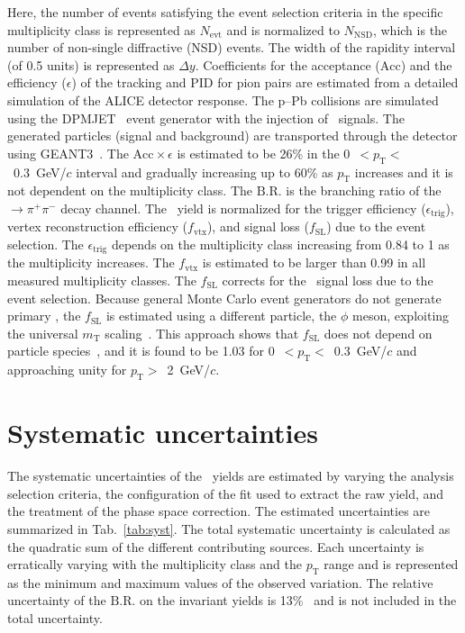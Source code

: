 Here, the number of events satisfying the event selection criteria in the specific multiplicity class is represented as $N_{\mathrm{evt}}$ and is normalized to $N_{\mathrm{NSD}}$, which is the number of non-single diffractive (NSD) events. The width of the rapidity interval (of 0.5 units) is represented as $\Delta y$. Coefficients for the acceptance ($\mathrm{Acc}$) and the efficiency ($\epsilon$) of the tracking and PID for pion pairs are estimated from a detailed simulation of the ALICE detector response. The p--Pb collisions are simulated using the DPMJET~\cite{Fedynitch:2015kcn} event generator with the injection of \fzero~signals. The generated particles (signal and background) are transported through the detector using GEANT3~\cite{Brun:1994aa}. The $\mathrm{Acc}\times\epsilon$ is estimated to be 26\% in the 0~$<p_{\mathrm{T}}<$~0.3~GeV/$c$ interval and gradually increasing up to 60\% as $p_{\mathrm{T}}$ increases and it is not dependent on the multiplicity class. The $\mathrm{B.R.}$ is the branching ratio of the \fzero~$\rightarrow \pi^{+}\pi^{-}$ decay channel. The \fzero~yield is normalized for the trigger efficiency ($\epsilon_{\mathrm{trig}}$), vertex reconstruction efficiency ($f_{\mathrm{vtx}}$), and signal loss ($f_{\mathrm{SL}}$) due to the event selection. The $\epsilon_{\mathrm{trig}}$ depends on the multiplicity class increasing from 0.84 to 1 as the multiplicity increases. The $f_{\mathrm{vtx}}$ is estimated to be larger than 0.99 in all measured multiplicity classes. The $f_{\mathrm{SL}}$ corrects for the \fzero~signal loss due to the event selection. Because general Monte Carlo event generators do not generate primary \fzero, the $f_{\mathrm{SL}}$ is estimated using a different particle, the $\phi$ meson, exploiting the universal $m_{\mathrm{T}}$ scaling~\cite{Altenkamper:2017qot}. This approach shows that $f_{\mathrm{SL}}$ does not depend on particle species~\cite{ALICE:2019xyr}, and it is found to be 1.03 for 0~$<p_{\mathrm{T}}<$~0.3~GeV/$c$ and approaching unity for $p_{\mathrm{T}}>$~2~GeV/$c$.

\section{Systematic uncertainties}
\label{sec:syst}
The systematic uncertainties of the \fzero~yields are estimated by varying the analysis selection criteria, the configuration of the fit used to extract the raw yield, and the treatment of the phase space correction. The estimated uncertainties are summarized in Tab.~\ref{tab:syst}. The total systematic uncertainty is calculated as the quadratic sum of the different contributing sources. Each uncertainty is erratically varying with the multiplicity class and the $p_{\mathrm{T}}$ range and is represented as the minimum and maximum values of the observed variation. The relative uncertainty of the $\mathrm{B.R.}$ on the invariant yields is 13\%~\cite{Stone:2013eaa} and is not included in the total uncertainty.


